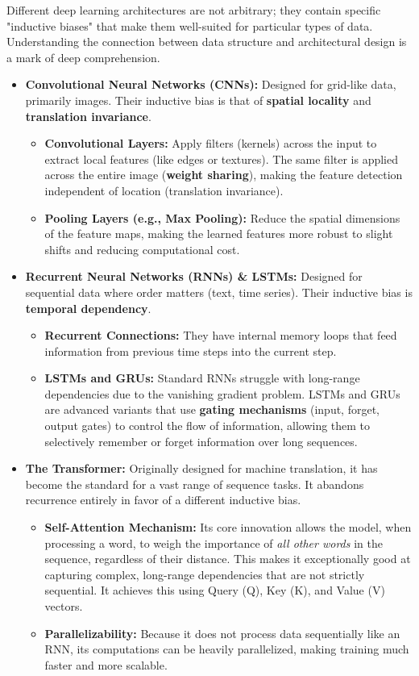 \documentclass[11pt,a4paper]{article}
\begin{document}
Different deep learning architectures are not arbitrary; they contain specific "inductive biases" that make them well-suited for particular types of data. Understanding the connection between data structure and architectural design is a mark of deep comprehension.

\begin{itemize}
    \item \textbf{Convolutional Neural Networks (CNNs):} Designed for grid-like data, primarily images. Their inductive bias is that of \textbf{spatial locality} and \textbf{translation invariance}.
    \begin{itemize}
        \item \textbf{Convolutional Layers:} Apply filters (kernels) across the input to extract local features (like edges or textures). The same filter is applied across the entire image (\textbf{weight sharing}), making the feature detection independent of location (translation invariance).
        \item \textbf{Pooling Layers (e.g., Max Pooling):} Reduce the spatial dimensions of the feature maps, making the learned features more robust to slight shifts and reducing computational cost.
    \end{itemize}
    \item \textbf{Recurrent Neural Networks (RNNs) \& LSTMs:} Designed for sequential data where order matters (text, time series). Their inductive bias is \textbf{temporal dependency}.
    \begin{itemize}
        \item \textbf{Recurrent Connections:} They have internal memory loops that feed information from previous time steps into the current step.
        \item \textbf{LSTMs and GRUs:} Standard RNNs struggle with long-range dependencies due to the vanishing gradient problem. LSTMs and GRUs are advanced variants that use \textbf{gating mechanisms} (input, forget, output gates) to control the flow of information, allowing them to selectively remember or forget information over long sequences.
    \end{itemize}
    \item \textbf{The Transformer:} Originally designed for machine translation, it has become the standard for a vast range of sequence tasks. It abandons recurrence entirely in favor of a different inductive bias.
    \begin{itemize}
        \item \textbf{Self-Attention Mechanism:} Its core innovation allows the model, when processing a word, to weigh the importance of \textit{all other words} in the sequence, regardless of their distance. This makes it exceptionally good at capturing complex, long-range dependencies that are not strictly sequential. It achieves this using Query (Q), Key (K), and Value (V) vectors.
        \item \textbf{Parallelizability:} Because it does not process data sequentially like an RNN, its computations can be heavily parallelized, making training much faster and more scalable.
    \end{itemize}
\end{itemize}
\end{document}
